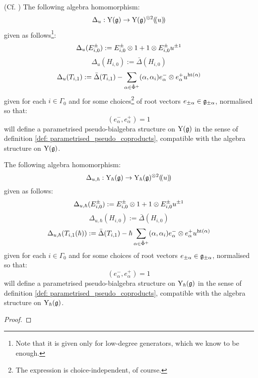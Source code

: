         \begin{theorem} \label{theorem: parametrised_pseudo_coproduct_on_yangians}
            (Cf. \cite[Theorem 6.2]{guay_nakajima_wendlandt_affine_yangian_coproduct}) The following algebra homomorphism:
                $$\Delta_u: \rmY(\g) \to \rmY(\g)^{\tensor 2}(\!(u)\!)$$
            given as follows\footnote{Note that it is given only for low-degree generators, which we know to be enough.}:
                $$\Delta_u(E_{i, 0}^{\pm}) := E_{i, 0}^{\pm} \tensor 1 + 1 \tensor E_{i, 0}^{\pm} u^{\pm 1}$$
                $$\Delta_u(H_{i, 0}) := \bar{\Delta}(H_{i, 0})$$
                $$\Delta_u(T_{i, 1}) := \bar{\Delta}(T_{i, 1}) - \sum_{\alpha \in \hat{\Phi}^+} (\alpha, \alpha_i) e_{\alpha}^- \tensor e_{\alpha}^+ u^{\height(\alpha)}$$
            given for each $i \in \Gamma_0$ and for some choices\footnote{The expression is choice-independent, of course.} of root vectors $e_{\pm\alpha} \in \mathfrak{g}_{\pm\alpha}$, normalised so that:
                $$(e_{\alpha}^-, e_{\alpha}^+) = 1$$
            will define a parametrised pseudo-bialgebra structure on $\mathrm{Y}(\mathfrak{g})$ in the sense of definition \ref{def: parametrised_pseudo_coproducts}, compatible with the algebra structure on $\mathrm{Y}(\mathfrak{g})$.
        \end{theorem}
        
        \begin{theorem} \label{theorem: parametrised_pseudo_coproduct_on_formal_yangians}
            The following algebra homomorphism:
                $$\Delta_{u, \hbar}: \rmY_{\hbar}(\g) \to \rmY_{\hbar}(\g)^{\tensor 2}(\!(u)\!)$$
            given as follows:
                $$\Delta_{u, \hbar}(E_{i, 0}^{\pm}) := E_{i, 0}^{\pm} \tensor 1 + 1 \tensor E_{i, 0}^{\pm} u^{\pm 1}$$
                $$\Delta_{u, \hbar}(H_{i, 0}) := \bar{\Delta}(H_{i, 0})$$
                $$\Delta_{u, \hbar}(T_{i, 1}(\hbar)) := \bar{\Delta}(T_{i, 1}) - \hbar \sum_{\alpha \in \hat{\Phi}^+} (\alpha, \alpha_i) e_{\alpha}^- \tensor e_{\alpha}^+ u^{\height(\alpha)}$$
            given for each $i \in \Gamma_0$ and for some choices of root vectors $e_{\pm\alpha} \in \mathfrak{g}_{\pm\alpha}$, normalised so that:
                $$(e_{\alpha}^-, e_{\alpha}^+) = 1$$
            will define a parametrised pseudo-bialgebra structure on $\mathrm{Y}_{\hbar}(\mathfrak{g})$ in the sense of definition \ref{def: parametrised_pseudo_coproducts}, compatible with the algebra structure on $\mathrm{Y}_{\hbar}(\mathfrak{g})$.
        \end{theorem}
            \begin{proof}
                
            \end{proof}

